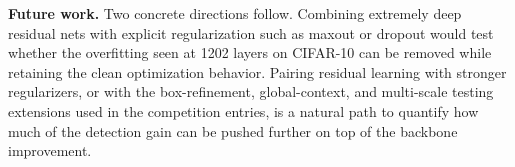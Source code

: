 \noindent\textbf{Future work.}
Two concrete directions follow. Combining extremely deep residual nets with
explicit regularization such as maxout or dropout would test whether the
overfitting seen at 1202 layers on CIFAR-10 can be removed while retaining the
clean optimization behavior. Pairing residual learning with stronger
regularizers, or with the box-refinement, global-context, and multi-scale
testing extensions used in the competition entries, is a natural path to
quantify how much of the detection gain can be pushed further on top of the
backbone improvement.
